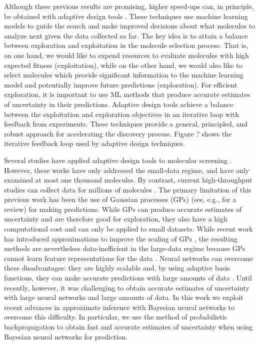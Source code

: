 Although these previous results are promising, higher speed-ups can, in principle, be obtained with adaptive design tools \cite{jones1998efficient}. These techniques use machine learning models to guide the search and make improved decisions about what molecules to analyze next given the data collected so far. The key idea is to attain a balance between exploration and exploitation in the molecule selection process.  That is, on one hand, we would like to expend resources to evaluate molecules with high expected fitness (exploitation), while on the other hand, we would also like to select molecules which provide significant information to the machine learning model and potentially improve future predictions (exploration). For efficient exploration, it is important to use ML methods that produce accurate estimates of uncertainty in their predictions.  Adaptive design tools achieve a balance between the exploitation and exploration objectives in an iterative loop with feedback from experiments.  These techniques provide a general, principled, and robust approach for accelerating the discovery process.  Figure ? shows the iterative feedback loop used by adaptive design techniques.

Several studies have applied adaptive design tools to molecular screening \cite{Xue_2016,Seko_2015,Negoescu_2011,De_Grave_2008}.  However, these works have only addressed the small-data regime, and have only examined at most one thousand molecules. By contrast, current high-throughput studies can collect data for millions of molecules \cite{Hachmann_2011}.  The primary limitation of this previous work has been the use of Gaussian processes (GPs) (see, e.g., \citet{rasmussen2006gaussian} for a review) for making predictions. While GPs can produce accurate estimates of uncertainty and are therefore good for exploration, they also have a high computational cost and can only be applied to small datasets.  While recent work has introduced approximations to improve the scaling of GPs \cite{snelson2005sparse,hensman2015scalable}, the resulting methods are
nevertheless data-inefficient in the large-data regime because GPs cannot learn feature representations for the data \cite{bengio2007scaling}. Neural networks can overcome these disadvantages: they are highly scalable and, by using adaptive basis functions, they can make accurate predictions with large amounts of data \cite{lecun2015deep}. Until recently, however, it was challenging to obtain accurate estimates of uncertainty with large neural networks and large amounts of data. In this work we exploit recent advances in approximate inference with Bayesian neural networks to overcome this difficulty. In particular, we use the method of probabilistic backpropagation \cite{Hernandez-Lobato15b} to obtain fast and accurate estimates of uncertainty when using Bayesian neural networks for prediction.

